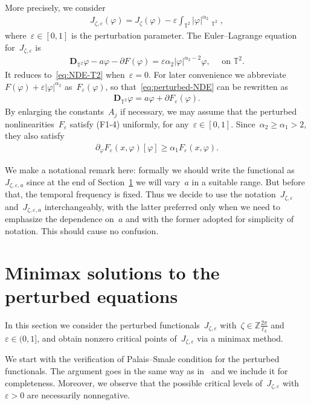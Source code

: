 \documentclass[11pt,final]{amsart}
\newcommand{\p}{\partial}
\newcommand{\T}{\mathbb{T}}
\newcommand{\dd}{\mathop{}\!\mathrm{d}}
\newcommand{\eps}{\varepsilon}
\newcommand{\pD}{\mathbf{D}}
\newcommand{\bZ}{\mathbb{Z}}
\DeclareMathOperator{\dv}{\dd{vol}}
\begin{document}
More precisely, we consider 
\begin{align}\label{eq:perturbed-functional}
    J_{\zeta,\eps}(\varphi)
    =J_\zeta(\varphi)- \eps\int_{\T^2} |\varphi|^{\alpha_2}\dv_{\T^2},
\end{align}
where~$\eps\in[0,1]$ is the perturbation parameter. 
The Euler--Lagrange equation for~$J_{\zeta,\eps}$ is 
\begin{align}\label{eq:perturbed-NDE}
    \pD_{\T^2}\varphi-a\varphi - \p F(\varphi)= \eps \alpha_2 |\varphi|^{\alpha_2 -2 }\varphi, \quad \mbox{ on } \T^2. 
\end{align}
It reduces to~\eqref{eq:NDE-T2} when~$\eps= 0$. 
For later convenience we abbreviate~$F(\varphi)+\eps|\varphi|^{\alpha_2}$ as~$F_\eps(\varphi)$, so that~\eqref{eq:perturbed-NDE} can be rewritten as 
\begin{align}
    \pD_{\T^2}\varphi = a\varphi + \p F_\eps(\varphi).
\end{align}
By enlarging the constants~$A_j$ if necessary, we may assume that the perturbed nonlinearities~$F_\eps$ satisfy (F1-4) uniformly, for any~$\eps\in [0,1]$. 
Since~$\alpha_2\geq\alpha_1>2$, they also satisfy 
\begin{align}
    \p_\varphi F_\eps(x,\varphi)[\varphi] \geq \alpha_1 F_\eps(x,\varphi).
\end{align}

We make a notational remark here: formally we should write the functional as~$J_{\zeta,\eps,a}$ since at the end of Section~\ref{sect:perturbed solutions} we will vary~$a$ in a suitable range. 
But before that, the temporal frequency is fixed.
Thus we decide to use the notation~$J_{\zeta,\eps}$ and~$J_{\zeta,\eps, a}$ interchangeably, with the latter preferred only when we need to emphasize the dependence on~$a$ and with the former adopted for simplicity of notation. 
This should cause no confusion. 


\section{Minimax solutions to the perturbed equations}\label{sect:perturbed solutions}

In this section we consider the perturbed functionals~$J_{\zeta,\eps}$ with~$\zeta\in\bZ\frac{2\pi}{\ell_3}$ and~$\eps\in (0,1]$, and obtain nonzero critical points of~$J_{\zeta,\eps}$ via a minimax method. 


We start with the verification of Palais--Smale condition for the perturbed functionals.
The argument goes in the same way as in~\cite{WZ2026Stationary} and we include it for completeness. 
Moreover, we observe that the possible critical levels of~$J_{\zeta,\eps}$ with~$\eps>0$ are necessarily nonnegative. 
\end{document}
